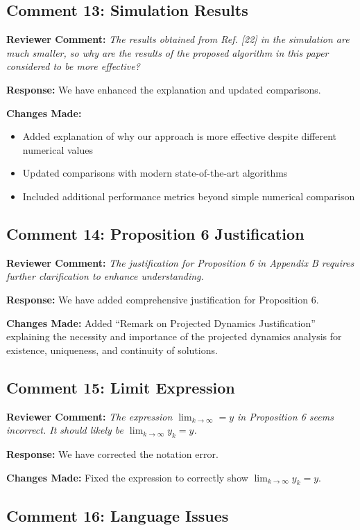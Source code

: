 \documentclass[11pt]{article}
\newcommand{\reviewercomment}[1]{\textbf{Reviewer Comment:} \textit{#1}}
\newcommand{\response}[1]{\textbf{Response:} #1}
\newcommand{\changes}[1]{\textbf{Changes Made:} #1}
\begin{document}
\subsection*{Comment 13: Simulation Results}

\reviewercomment{The results obtained from Ref. [22] in the simulation are much smaller, so why are the results of the proposed algorithm in this paper considered to be more effective?}

\response{We have enhanced the explanation and updated comparisons.}

\changes{
\begin{itemize}
\item Added explanation of why our approach is more effective despite different numerical values
\item Updated comparisons with modern state-of-the-art algorithms
\item Included additional performance metrics beyond simple numerical comparison
\end{itemize}
}

\subsection*{Comment 14: Proposition 6 Justification}

\reviewercomment{The justification for Proposition 6 in Appendix B requires further clarification to enhance understanding.}

\response{We have added comprehensive justification for Proposition 6.}

\changes{Added ``Remark on Projected Dynamics Justification'' explaining the necessity and importance of the projected dynamics analysis for existence, uniqueness, and continuity of solutions.}

\subsection*{Comment 15: Limit Expression}

\reviewercomment{The expression $\lim_{k \to \infty}=y$ in Proposition 6 seems incorrect. It should likely be $\lim_{k \to \infty} y_k=y$.}

\response{We have corrected the notation error.}

\changes{Fixed the expression to correctly show $\lim_{k \to \infty} y_k=y$.}

\subsection*{Comment 16: Language Issues}
\end{document}
